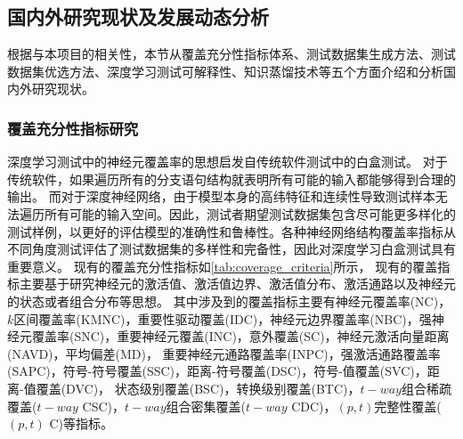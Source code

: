 \subsection{国内外研究现状及发展动态分析}\label{relatedwork}


根据与本项目的相关性，本节从覆盖充分性指标体系、测试数据集生成方法、测试数据集优选方法、深度学习测试可解释性、知识蒸馏技术等五个方面介绍和分析国内外研究现状。




\subsubsection{覆盖充分性指标研究}

深度学习测试中的神经元覆盖率的思想启发自传统软件测试中的白盒测试。
对于传统软件，如果遍历所有的分支语句结构就表明所有可能的输入都能够得到合理的输出。
而对于深度神经网络，由于模型本身的高纬特征和连续性导致测试样本无法遍历所有可能的输入空间。因此，测试者期望测试数据集包含尽可能更多样化的测试样例，以更好的评估模型的准确性和鲁棒性。各种神经网络结构覆盖率指标从不同角度测试评估了测试数据集的多样性和完备性，因此对深度学习白盒测试具有重要意义。 
现有的覆盖充分性指标如\cref{tab:coverage_criteria}所示，
现有的覆盖指标主要基于研究神经元的激活值、激活值边界、激活值分布、激活通路以及神经元的状态或者组合分布等思想。
其中涉及到的覆盖指标主要有神经元覆盖率(NC)，$k$区间覆盖率(KMNC)，重要性驱动覆盖(IDC)，神经元边界覆盖率(NBC)，强神经元覆盖率(SNC)，重要神经元覆盖(INC)，意外覆盖(SC)，神经元激活向量距离(NAVD)，平均偏差(MD)，
重要神经元通路覆盖率(INPC)，强激活通路覆盖率(SAPC)，符号-符号覆盖(SSC)，距离-符号覆盖(DSC)，符号-值覆盖(SVC)，距离-值覆盖(DVC)，
状态级别覆盖(BSC)，转换级别覆盖(BTC)，$t-way$组合稀疏覆盖($t-way$ CSC)，$t-way$组合密集覆盖($t-way$ CDC)，$(p,t)$完整性覆盖($(p,t)$ C)等指标。

